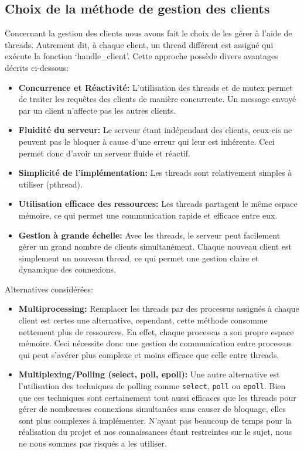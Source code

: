 \documentclass[utf8]{article}
\begin{document}
\subsection{Choix de la méthode de gestion des clients}
Concernant la gestion des clients nous avons fait le choix de les gérer à l'aide de threads. Autrement dit, à chaque client, un thread différent est assigné qui exécute
la fonction `handle\_client'. Cette approche possède divers avantages décrits ci-dessous:
\begin{itemize}
    \item \textbf{Concurrence et Réactivité:} L'utilisation des threads et de mutex permet de traiter les requêtes des clients de manière concurrente. Un message envoyé par un client n'affecte pas les autres clients.
    \item \textbf{Fluidité du serveur:} Le serveur étant indépendant des clients, ceux-cis ne peuvent pas le bloquer à cause d'une erreur qui leur est inhérente. Ceci permet donc d'avoir un serveur fluide et réactif.
    \item \textbf{Simplicité de l'implémentation:} Les threads sont relativement simples à utiliser (pthread).
    \item \textbf{Utilisation efficace des ressources:} Les threads partagent le même espace mémoire, ce qui permet une communication rapide et efficace entre eux.
    \item \textbf{Gestion à grande échelle:} Avec les threads, le serveur peut facilement gérer un grand nombre de clients simultanément. Chaque nouveau client est simplement un nouveau thread, 
    ce qui permet une gestion claire et dynamique des connexions.
\end{itemize}

Alternatives considérées:
\begin{itemize}
    \item \textbf{Multiprocessing:} Remplacer les threads par des processus assignés à chaque client est certes une alternative, cependant, cette méthode consomme nettement plus de ressources. En effet, chaque 
    processus a son propre espace mémoire. Ceci nécessite donc une gestion de communication entre processus qui peut s'avérer plus complexe et moins efficace que celle entre threads.
    \item \textbf{Multiplexing/Polling (select, poll, epoll):} Une autre alternative est l'utilisation des techniques de polling comme \texttt{select}, \texttt{poll} ou \texttt{epoll}. 
    Bien que ces techniques sont certainement tout aussi efficaces que les threads pour gérer de nombreuses connexions simultanées sans causer de bloquage, elles sont plus complexes à implémenter. N'ayant pas beaucoup de temps 
    pour la réalisation du projet et nos connaissances étant restreintes sur le sujet, nous ne nous sommes pas risqués a les utiliser.
\end{itemize}
\end{document}
